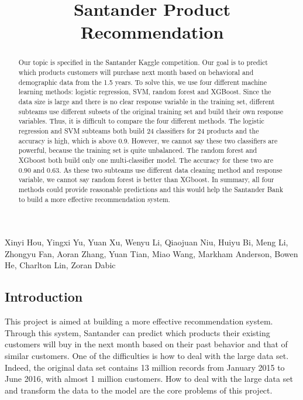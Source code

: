 \documentclass{article}
\title{Santander Product Recommendation}
\begin{document}
	\maketitle
	\begin{center}\begin{Large} Xinyi Hou,
			Yingxi Yu,
			Yuan Xu,
			Wenyu Li,
			Qiaojuan Niu,
			Huiyu Bi,
			Meng Li,
			Zhongyu Fan,
			Aoran Zhang,
			Yuan Tian,
			Miao Wang,
			Markham Anderson,
			Bowen He,
			Charlton Lin,
			Zoran Dabic \end{Large}\end{center}
	\begin{spacing}{1}
		\begin{large}

\begin{abstract}
	 Our topic is specified in the Santander Kaggle competition. Our goal is to predict which products customers will purchase next month based on behavioral and demographic data from the 1.5 years. To solve this, we use four different machine learning methods: logistic regression, SVM, random forest and XGBoost. Since the data size is large and there is no clear response variable in the training set, different subteams use different subsets of the original training set and build their own response variables. Thus, it is difficult to compare the four different methods. The logistic regression and SVM subteams both build 24 classifiers for 24 products and the accuracy is high, which is above 0.9. However, we cannot say these two classifiers are powerful, because the training set is quite unbalanced. The random forest and XGboost both build only one multi-classifier model. The accuracy for these two are 0.90 and 0.63. As these two subteams use different data cleaning method and response variable, we cannot say random forest is better than XGboost. In summary, all four methods could provide reasonable predictions and this would help the Santander Bank to build a more effective recommendation system.
\end{abstract}

\section{Introduction}
This project is aimed at building a more effective recommendation system. Through this system, Santander can predict which products their existing customers will buy in the next month based on their past behavior and that of similar customers. One of the difficulties is how to deal with the large data set. Indeed, the original data set contains 13 million records from January 2015 to June 2016, with almost 1 million customers. How to deal with the large data set and transform the data to the model are the core problems of this project.


\end{large}
\end{spacing}
\end{document}
